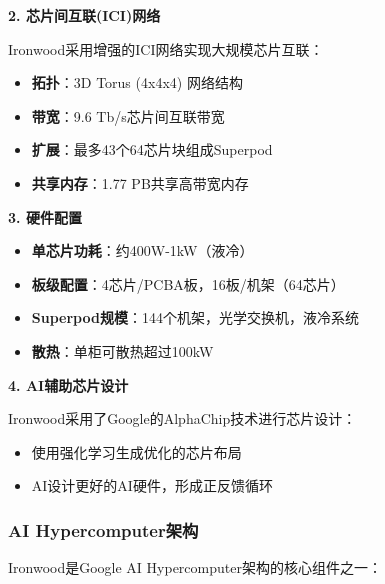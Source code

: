\textbf{2. 芯片间互联(ICI)网络}

Ironwood采用增强的ICI网络实现大规模芯片互联：
\begin{itemize}
    \item \textbf{拓扑}：3D Torus (4x4x4) 网络结构
    \item \textbf{带宽}：9.6 Tb/s芯片间互联带宽
    \item \textbf{扩展}：最多43个64芯片块组成Superpod
    \item \textbf{共享内存}：1.77 PB共享高带宽内存
\end{itemize}

\textbf{3. 硬件配置}

\begin{itemize}
    \item \textbf{单芯片功耗}：约400W-1kW（液冷）
    \item \textbf{板级配置}：4芯片/PCBA板，16板/机架（64芯片）
    \item \textbf{Superpod规模}：144个机架，光学交换机，液冷系统
    \item \textbf{散热}：单柜可散热超过100kW
\end{itemize}

\textbf{4. AI辅助芯片设计}

Ironwood采用了Google的AlphaChip技术进行芯片设计：
\begin{itemize}
    \item 使用强化学习生成优化的芯片布局
    \item AI设计更好的AI硬件，形成正反馈循环
\end{itemize}

\subsubsection{AI Hypercomputer架构}

Ironwood是Google AI Hypercomputer架构的核心组件之一：

